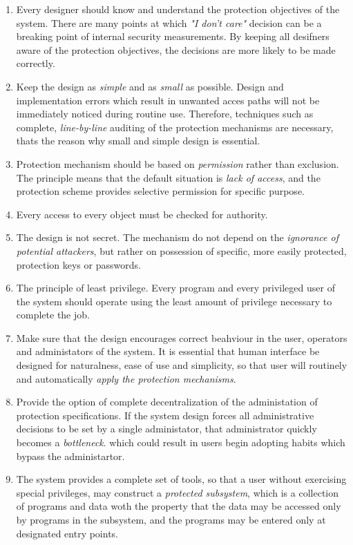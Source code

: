 \begin{enumerate}
    \item Every designer should know and understand the protection objectives of the system.
     There are many points at which \textit{"I don't care"} decision can be a breaking point 
     of internal security measurements. By keeping all desifners aware of the protection objectives, 
     the decisions are more likely to be made correctly.
     
     \item Keep the design as \textit{simple} and as \textit{small} as possible. Design and 
     implementation errors which result in unwanted acces paths will not be immediately noticed during 
     routine use. Therefore, techniques such as complete, \textit{line-by-line} auditing of the 
     protection mechanisms are necessary, thats the reason why small and simple design is 
     essential.

     \item Protection mechanism should be based on \textit{permission} rather than exclusion. 
     The principle means that the default situation is \textit{lack of access}, and the protection 
     scheme provides selective permission for specific purpose.

     \item Every access to every object must be checked for authority.
     
     \item The design is not secret. The mechanism do not depend on the \textit{ignorance of potential 
     attackers}, but rather on possession of specific, more easily protected, protection keys or 
     passwords. 

     \item The principle of least privilege. Every program and every privileged user of the system 
     should operate using the least amount of privilege necessary to complete the job.

     \item Make sure that the design encourages correct beahviour in the user, operators and 
     administators of the system. It is essential that human interface be designed for naturalness, 
     ease of use and simplicity, so that user will routinely and automatically \textit{apply the 
     protection mechanisms}.

     \item Provide the option of complete decentralization of the administation of protection 
     specifications. If the system design forces all administrative decisions to be set by a single 
     administator, that administrator quickly becomes a \textit{bottleneck}. which could result in users 
     begin adopting habits which bypass the administartor.

     \item The system provides a complete set of tools, so that a user without exercising special 
     privileges, may construct a \textit{protected subsystem}, which is a collection of programs 
     and data woth the property that the data may be accessed only by programs in the subsystem, and 
     the programs may be entered only at designated entry points.
\end{enumerate}


